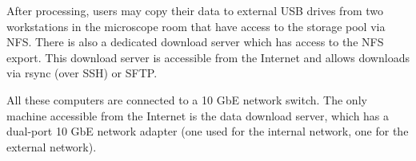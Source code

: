 


After processing, users may  copy their data to external USB drives from two workstations in the microscope room that have access to the storage pool via NFS.
There is also a dedicated download server which has access to the NFS export. This download server is accessible from  the Internet and allows downloads via rsync (over SSH) or SFTP. 

All these computers are connected to a 10 GbE network switch. The only machine accessible from the Internet is the data download server, which has a dual-port 10 GbE network adapter (one used for the internal network, one for the external network). %

